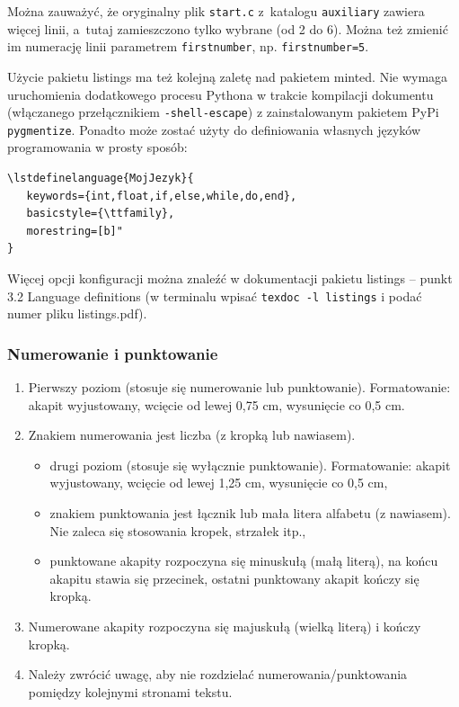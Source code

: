 \documentclass[12pt,twoside,openright]{article}
\begin{document}
Można zauważyć, że oryginalny plik \texttt{start.c} z~katalogu \texttt{auxiliary} zawiera więcej linii, a~tutaj zamieszczono tylko wybrane (od 2 do 6). 
Można też zmienić im numerację linii parametrem \verb|firstnumber|, np. \verb|firstnumber=5|.

Użycie pakietu listings ma też kolejną zaletę nad pakietem minted. 
Nie wymaga uruchomienia dodatkowego procesu Pythona w trakcie kompilacji dokumentu (włączanego przełącznikiem \verb|-shell-escape|) z zainstalowanym pakietem PyPi \verb|pygmentize|.
Ponadto może zostać użyty do definiowania własnych języków programowania w prosty sposób:
\begin{verbatim}
\lstdefinelanguage{MojJezyk}{
   keywords={int,float,if,else,while,do,end},
   basicstyle={\ttfamily},
   morestring=[b]"
}
\end{verbatim}
Więcej opcji konfiguracji można znaleźć w dokumentacji pakietu listings -- punkt 3.2 Language definitions (w terminalu wpisać \verb|texdoc -l listings| i podać numer pliku listings.pdf).

\subsubsection{Numerowanie i punktowanie}

\begin{enumerate}[label=\arabic*), leftmargin=1.25cm]
	\item Pierwszy poziom (stosuje się numerowanie lub punktowanie). Formatowanie:
	akapit wyjustowany, wcięcie od lewej 0,75 cm, wysunięcie co 0,5 cm.
	\item Znakiem numerowania jest liczba (z kropką lub nawiasem).
		\begin{itemize}[label={--},labelsep=0.4cm,leftmargin=0.6cm]
			\item drugi poziom (stosuje się wyłącznie punktowanie). Formatowanie: akapit
			wyjustowany, wcięcie od lewej 1,25 cm, wysunięcie co 0,5 cm,
			\item znakiem punktowania jest łącznik lub mała litera alfabetu (z nawiasem). Nie
			zaleca się stosowania kropek, strzałek itp.,
			\item punktowane akapity rozpoczyna się minuskułą (małą literą), na końcu akapitu
			stawia się przecinek, ostatni punktowany akapit kończy się kropką.
		\end{itemize}
	\item Numerowane akapity rozpoczyna się majuskułą (wielką literą) i kończy kropką.
	\item Należy zwrócić uwagę, aby nie rozdzielać numerowania/punktowania pomiędzy
	kolejnymi stronami tekstu.
\end{enumerate}
\end{document}
